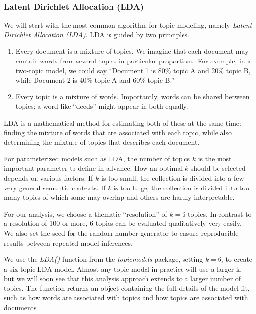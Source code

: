 \documentclass[
]{article}
\providecommand{\tightlist}{%
  \setlength{\itemsep}{0pt}\setlength{\parskip}{0pt}}
\begin{document}
\normalsize

\hypertarget{latent-dirichlet-allocation-lda}{%
\subsubsection{Latent Dirichlet Allocation (LDA)}\label{latent-dirichlet-allocation-lda}}

We will start with the most common algorithm for topic modeling, namely \emph{Latent Dirichlet Allocation (LDA)}. LDA is guided by two principles.

\begin{enumerate}
\def\labelenumi{\arabic{enumi}.}
\tightlist
\item
  Every document is a mixture of topics. We imagine that each document may contain words from several topics in particular proportions. For example, in a two-topic model, we could say ``Document 1 is 80\% topic A and 20\% topic B, while Document 2 is 40\% topic A and 60\% topic B.''
\item
  Every topic is a mixture of words. Importantly, words can be shared between topics; a word like ``deeds'' might appear in both equally.
\end{enumerate}

LDA is a mathematical method for estimating both of these at the same time: finding the mixture of words that are associated with each topic, while also determining the mixture of topics that describes each document.

For parameterized models such as LDA, the number of topics \(k\) is the most important parameter to define in advance. How an optimal \(k\) should be selected depends on various factors. If \(k\) is too small, the collection is divided into a few very general semantic contexts. If \(k\) is too large, the collection is divided into too many topics of which some may overlap and others are hardly interpretable.

For our analysis, we choose a thematic ``resolution'' of \(k = 6\) topics. In contrast to a resolution of 100 or more, 6 topics can be evaluated qualitatively very easily. We also set the seed for the random number generator to ensure reproducible results between repeated model inferences.

We use the \emph{LDA()} function from the \emph{topicmodels} \citep{topicmodels} package, setting \(k = 6\), to create a six-topic LDA model. Almost any topic model in practice will use a larger k, but we will soon see that this analysis approach extends to a larger number of topics. The function returns an object containing the full details of the model fit, such as how words are associated with topics and how topics are associated with documents.
\end{document}
